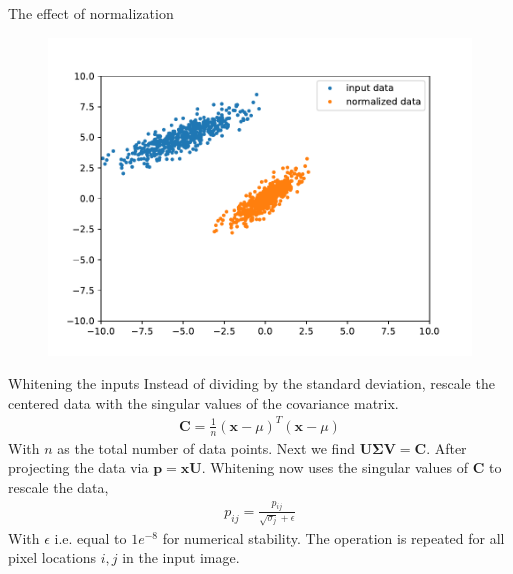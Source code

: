 \documentclass{beamer}
\begin{document}
    \begin{frame}{The effect of normalization}
      \begin{figure}
      \includegraphics[width=\linewidth]{./figures/normalized.pdf}
      \end{figure}
    \end{frame}

    \begin{frame}{Whitening the inputs \cite{CS231n}}
      Instead of dividing by the standard deviation, rescale the centered data with the singular values of the covariance matrix.
      \begin{align}
        \mathbf{C} = \frac{1}{n} (\mathbf{x} - \mu)^T(\mathbf{x} - \mu)
      \end{align}
      With $n$ as the total number of data points. Next we find $\mathbf{U}\mathbf{\Sigma}\mathbf{V} = \mathbf{C}$.
      After projecting the data via $\mathbf{p} = \mathbf{x}\mathbf{U}$. Whitening now uses the singular values of $\mathbf{C}$ to rescale the data,
      \begin{align}
        p_{ij} = \frac{p_{ij}}{\sqrt{\sigma_j} + \epsilon}
      \end{align}
      With $\epsilon$ i.e. equal to $1e^{-8}$ for numerical stability.
      The operation is repeated for all pixel locations $i,j$ in the input image.
    \end{frame}
\end{document}
